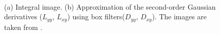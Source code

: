 \begin{description}
	\begin{figure}
	\centering	
	\
	\			
	\caption[Integral image and approximation of the Gaussian second order derivatives using box filter]{(a) Integral image. (b) Approximation of the second-order Gaussian derivatives ($L_{yy}$, $L_{xy}$) using box filters($D_{yy}$, $D_{xy}$). The images are taken from \cite{bay2006surf}.}
	\end{figure}
		
	

\end{description}
